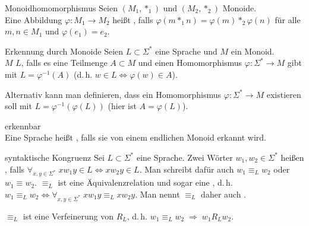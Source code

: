 \begin{Def}{Monoidhomomorphismus}
    Seien $(M_1, \ast_1)$ und $(M_2, \ast_2)$ Monoide.\\
    Eine Abbildung $\varphi\colon M_1 \rightarrow M_2$ heißt
    , falls
    $\varphi(m \ast_1 n) = \varphi(m) \ast_2 \varphi(n)$ für alle
    $m, n \in M_1$ und $\varphi(e_1) = e_2$.
\end{Def}

\begin{Def}{Erkennung durch Monoide}
    Seien $L \subset \Sigma^\ast$ eine Sprache und $M$ ein Monoid.\\
    $M$  $L$, falls es eine Teilmenge $A \subset M$ und
    einen Homomorphismus $\varphi\colon \Sigma^\ast \rightarrow M$
    gibt mit $L = \varphi^{-1}(A)$
    (d.\,h. $w \in L \iff \varphi(w) \in A$).
\end{Def}

\begin{Bem}
    Alternativ kann man definieren, dass
    ein Homomorphismus $\varphi\colon \Sigma^\ast \rightarrow M$ existieren
    soll mit $L = \varphi^{-1}(\varphi(L))$
    (hier ist $A = \varphi(L)$).
\end{Bem}

\begin{Def}{erkennbar}\\
    Eine Sprache heißt , falls sie von einem endlichen
    Monoid erkannt wird.
\end{Def}

\linie

\begin{Def}{syntaktische Kongruenz}
    Sei $L \subset \Sigma^\ast$ eine Sprache.
    Zwei Wörter $w_1, w_2 \in \Sigma^\ast$ heißen ,
    falls $\forall_{x, y \in \Sigma^\ast}\;
    x w_1 y \in L \iff x w_2 y \in L$.
    Man schreibt dafür auch $w_1 \equiv_L w_2$ oder $w_1 \equiv w_2$.
    $\equiv_L$ ist eine Äquivalenzrelation und sogar eine ,
    d.\,h.\\
    $w_1 \equiv_L w_2 \iff
    \forall_{x, y \in \Sigma^\ast}\; x w_1 y \equiv_L x w_2 y$.
    Man nennt $\equiv_L$ daher auch .
\end{Def}

\begin{Bem}
    $\equiv_L$ ist eine Verfeinerung von $R_L$, d.\,h.
    $w_1 \equiv_L w_2 \;\Rightarrow\; w_1 R_L w_2$.
\end{Bem}

